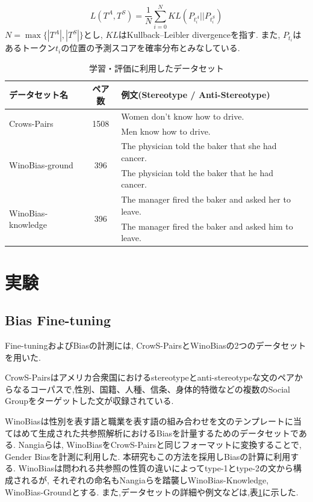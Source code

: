 \documentclass[
  platex, dvipdfmx %
]{nlp2021}
\begin{document}
\begin{equation}
\label{eq:loss_function}
L(T^A, T^S) = \frac{1}{N}\sum_{i=0}^{N}{KL(P_{t^A_i} || P_{t^S_i})}
\end{equation}
$N = \max \{|T^A|, |T^S|\}$とし, $KL$はKullback–Leibler divergenceを指す.
また, $P_{t_i}$はあるトークン$t_i$の位置の予測スコアを確率分布とみなしている.

\begin{table}[h]
\centering
\begin{tabular}{lcll}
\hline
データセット名 & ペア数 & 例文(Stereotype / Anti-Stereotype) \\
\hline
\multirow{2}{*}{Crows-Pairs} & \multirow{2}{*}{1508} & Women don't know how to drive.\\
 & & Men know how to drive. \\
\hline
\multirow{2}{*}{WinoBias-ground} & \multirow{2}{*}{396} & The physician told the baker that she had cancer.\\
 & & The physician told the baker that he had cancer. \\
\hline
\multirow{2}{*}{WinoBias-knowledge} & \multirow{2}{*}{396} & The manager fired the baker and asked her to leave.\\
 & & The manager fired the baker and asked him to leave. \\
\hline
\end{tabular}
\caption{学習・評価に利用したデータセット}
\label{tab:datasets}
\end{table}

\section{実験}
\subsection{Bias Fine-tuning}
Fine-tuningおよびBiasの計測には, CrowS-Pairs\cite{nangia2020crows}とWinoBias\cite{zhao-etal-2018-gender}の2つのデータセットを用いた.

CrowS-Pairsはアメリカ合衆国におけるstereotypeとanti-stereotypeな文のペアからなるコーパスで,性別、国籍、人種、信条、身体的特徴などの複数のSocial Groupをターゲットした文が収録されている.

WinoBiasは性別を表す語と職業を表す語の組み合わせを文のテンプレートに当てはめて生成された共参照解析におけるBiasを計量するためのデータセットである. Nangiaら\cite{nangia2020crows}は, WinoBiasをCrowS-Pairsと同じフォーマットに変換することで, Gender Biasを計測に利用した. 本研究もこの方法を採用しBiasの計算に利用する. WinoBiasは問われる共参照の性質の違いによってtype-1とtype-2の文から構成されるが, それぞれの命名もNangiaらを踏襲しWinoBias-Knowledge, WinoBias-Groundとする.
また,データセットの詳細や例文などは,表\ref{tab:datasets}に示した.
\end{document}
